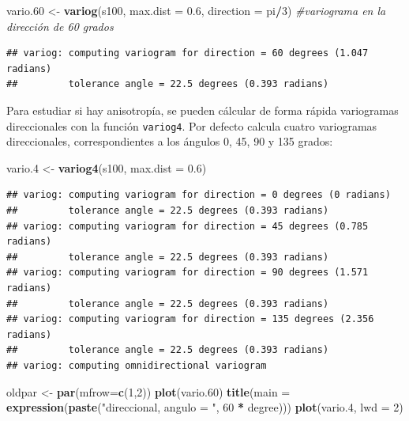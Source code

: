 \documentclass[
]{book}
\newenvironment{Shaded}{\begin{snugshade}}{\end{snugshade}}
\newcommand{\AttributeTok}[1]{\textcolor[rgb]{0.13,0.29,0.53}{#1}}
\newcommand{\CommentTok}[1]{\textcolor[rgb]{0.56,0.35,0.01}{\textit{#1}}}
\newcommand{\DecValTok}[1]{\textcolor[rgb]{0.00,0.00,0.81}{#1}}
\newcommand{\FloatTok}[1]{\textcolor[rgb]{0.00,0.00,0.81}{#1}}
\newcommand{\FunctionTok}[1]{\textcolor[rgb]{0.13,0.29,0.53}{\textbf{#1}}}
\newcommand{\NormalTok}[1]{#1}
\newcommand{\OtherTok}[1]{\textcolor[rgb]{0.56,0.35,0.01}{#1}}
\newcommand{\SpecialCharTok}[1]{\textcolor[rgb]{0.81,0.36,0.00}{\textbf{#1}}}
\newcommand{\StringTok}[1]{\textcolor[rgb]{0.31,0.60,0.02}{#1}}
\theoremstyle{break}
\theoremstyle{definition}
\theoremstyle{definition}
\theoremstyle{definition}
\theoremstyle{definition}
\theoremstyle{remark}
\begin{document}
\begin{Shaded}
\begin{Highlighting}[]
\NormalTok{vario}\FloatTok{.60} \OtherTok{\textless{}{-}} \FunctionTok{variog}\NormalTok{(s100, }\AttributeTok{max.dist =} \FloatTok{0.6}\NormalTok{, }\AttributeTok{direction =}\NormalTok{ pi}\SpecialCharTok{/}\DecValTok{3}\NormalTok{) }\CommentTok{\#variograma en la dirección de 60 grados}
\end{Highlighting}
\end{Shaded}

\begin{verbatim}
## variog: computing variogram for direction = 60 degrees (1.047 radians)
##         tolerance angle = 22.5 degrees (0.393 radians)
\end{verbatim}

Para estudiar si hay anisotropía, se pueden cálcular de forma rápida variogramas
direccionales con la función \texttt{variog4}. Por defecto calcula cuatro variogramas
direccionales, correspondientes a los ángulos 0, 45, 90 y 135 grados:

\begin{Shaded}
\begin{Highlighting}[]
\NormalTok{vario}\FloatTok{.4} \OtherTok{\textless{}{-}} \FunctionTok{variog4}\NormalTok{(s100, }\AttributeTok{max.dist =} \FloatTok{0.6}\NormalTok{)}
\end{Highlighting}
\end{Shaded}

\begin{verbatim}
## variog: computing variogram for direction = 0 degrees (0 radians)
##         tolerance angle = 22.5 degrees (0.393 radians)
## variog: computing variogram for direction = 45 degrees (0.785 radians)
##         tolerance angle = 22.5 degrees (0.393 radians)
## variog: computing variogram for direction = 90 degrees (1.571 radians)
##         tolerance angle = 22.5 degrees (0.393 radians)
## variog: computing variogram for direction = 135 degrees (2.356 radians)
##         tolerance angle = 22.5 degrees (0.393 radians)
## variog: computing omnidirectional variogram
\end{verbatim}

\begin{Shaded}
\begin{Highlighting}[]
\NormalTok{oldpar }\OtherTok{\textless{}{-}} \FunctionTok{par}\NormalTok{(}\AttributeTok{mfrow=}\FunctionTok{c}\NormalTok{(}\DecValTok{1}\NormalTok{,}\DecValTok{2}\NormalTok{))}
\FunctionTok{plot}\NormalTok{(vario}\FloatTok{.60}\NormalTok{)}
\FunctionTok{title}\NormalTok{(}\AttributeTok{main =} \FunctionTok{expression}\NormalTok{(}\FunctionTok{paste}\NormalTok{(}\StringTok{"direccional, angulo = "}\NormalTok{, }\DecValTok{60} \SpecialCharTok{*}\NormalTok{ degree)))}
\FunctionTok{plot}\NormalTok{(vario}\FloatTok{.4}\NormalTok{, }\AttributeTok{lwd =} \DecValTok{2}\NormalTok{)}
\end{Highlighting}
\end{Shaded}
\end{document}
